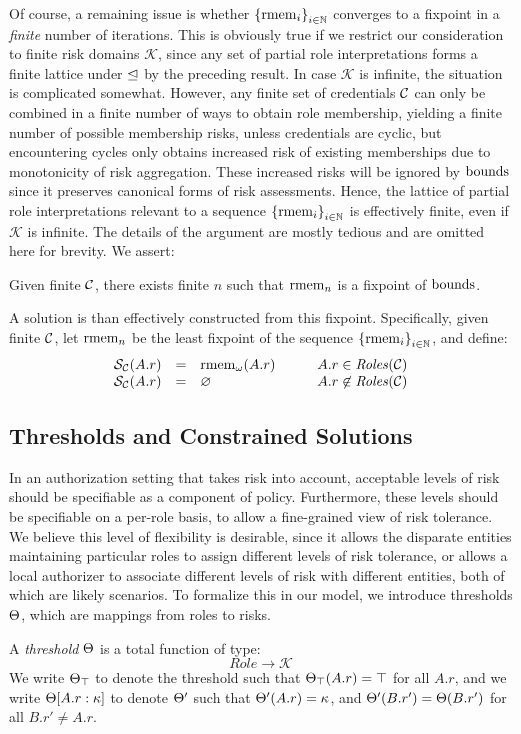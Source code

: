 Of course, a remaining issue is whether $\left\{\mathrm{rmem}_i\right\}_{i \in
\mathbb{N}}$ converges to a fixpoint in a \emph{finite} number of
iterations.  This is obviously true if we restrict our consideration
to finite risk domains $\mathcal{K}$, since any set of partial role
interpretations forms a finite lattice under $\unlhd$ by the
preceding result.  In case $\mathcal{K}$ is infinite, the situation is
complicated somewhat.  However, any finite set of credentials $\mathcal{C}$
can only be combined in a finite number of ways to obtain role
membership, yielding a finite number of possible membership risks,
unless credentials are cyclic, but encountering cycles only obtains
increased risk of existing memberships due to monotonicity of risk
aggregation.  These increased risks will be ignored by $\mathrm{bounds}$ since
it preserves canonical forms of risk assessments.  Hence, the lattice
of partial role interpretations relevant to a sequence
$\left\{\mathrm{rmem}_i\right\}_{i \in \mathbb{N}}$ is effectively finite, even if
$\mathcal{K}$ is infinite.  The details of the argument are mostly
tedious and are omitted here for brevity.  We assert:
\begin{lemma}
Given finite $\mathcal{C}$, there exists finite $n$ such that $\mathrm{rmem}_n$ is 
a fixpoint of $\mathrm{bounds}$.
\end{lemma}
A solution is than effectively constructed from this fixpoint.
Specifically, given finite $\mathcal{C}$, let $\mathrm{rmem}_n$ be the
least fixpoint of the sequence $\left\{\mathrm{rmem}_i\right\}_{i \in \mathbb{N}}$, 
and define:
$$
\begin{array}{rclr}
\mathcal{S}_{\mathcal{C}}(A.r) &=& \mathrm{rmem}_\omega(A.r) \qquad &  A.r \in \mathit{Roles}(\mathcal{C}) \\
\mathcal{S}_{\mathcal{C}}(A.r) &=& \varnothing & A.r \not\in \mathit{Roles}(\mathcal{C})
\end{array}
$$

\subsection{Thresholds and Constrained Solutions}

In an authorization setting that takes risk into account, acceptable
levels of risk should be specifiable as a component of policy.
Furthermore, these levels should be specifiable on a per-role basis,
to allow a fine-grained view of risk tolerance.  We believe this level
of flexibility is desirable, since it allows the disparate entities
maintaining particular roles to assign different levels of risk
tolerance, or allows a local authorizer to associate different levels
of risk with different entities, both of which are likely scenarios.
To formalize this in our model, we introduce thresholds $\Theta$,
which are mappings from roles to risks.    
\begin{definition}
A \emph{threshold} $\Theta$ is a total function of type:
$$
\mathit{Role} \rightarrow \mathcal{K}
$$ 
We write $\Theta_\top$ to denote the threshold such that 
$\Theta_\top(A.r) = \top$ for all $A.r$, and we write
$\Theta[A.r : \kappa]$ to denote $\Theta'$
such that $\Theta'(A.r) = \kappa$, and 
$\Theta'(B.r') = \Theta(B.r')$ for all $B.r' \ne A.r$. 
\end{definition}

